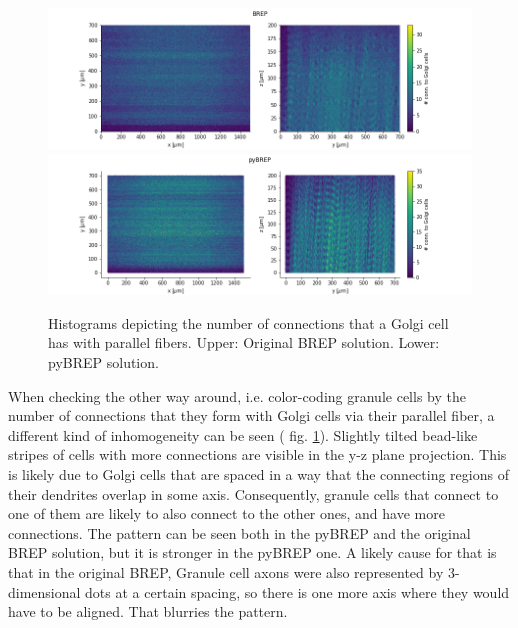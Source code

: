 \documentclass[12pt]{report}
\begin{document}
\begin{figure}[H]
\begin{minipage}[r]{14cm}
\vspace{0pt}
\centering
\includegraphics[width = 14 cm]{./figures/brep_pf_scatter.png}
\includegraphics[width = 14 cm]{./figures/pybrep_pf_scatter.png}
\end{minipage}
\hfill
\caption{Histograms depicting the number of connections that a Golgi cell has with parallel fibers. Upper: Original BREP solution. Lower: pyBREP solution.}
\label{f:pf_scatter}
\end{figure}

When checking the other way around, i.e. color-coding granule cells by the number of connections that they form with Golgi cells via their parallel fiber, a different kind of inhomogeneity can be seen ( fig. \ref{f:pf_scatter}). Slightly tilted bead-like stripes of cells with more connections are visible in the y-z plane projection. This is likely due to Golgi cells that are spaced in a way that the connecting regions of their dendrites overlap in some axis. Consequently, granule cells that connect to one of them are likely to also connect to the other ones, and have more connections. The pattern can be seen both in the pyBREP and the original BREP solution, but it is stronger in the pyBREP one. A likely cause for that is that in the original BREP, Granule cell axons were also represented by 3-dimensional dots at a certain spacing, so there is one more axis where they would have to be aligned. That blurries the pattern.  
 
\end{document}
